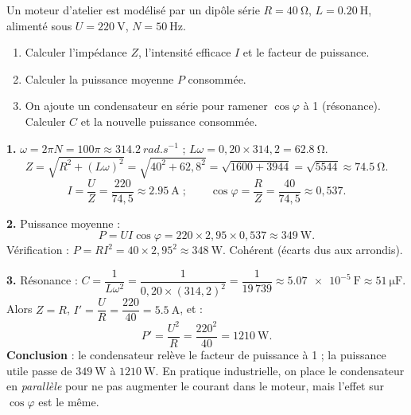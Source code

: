 \documentclass[11pt]{article}
\begin{document}
\begin{exoresolu}
Un moteur d'atelier est modélisé par un dipôle série $R = \SI{40}{\ohm}$, $L = \SI{0,20}{\henry}$, alimenté sous $U = \SI{220}{\volt}$, $N = \SI{50}{\hertz}$.
\begin{enumerate}
\item Calculer l'impédance $Z$, l'intensité efficace $I$ et le facteur de puissance.
\item Calculer la puissance moyenne $P$ consommée.
\item On ajoute un condensateur en série pour ramener $\cos\varphi$ à 1 (résonance). Calculer $C$ et la nouvelle puissance consommée.
\end{enumerate}
\tcblower
\textbf{1.} $\omega = 2\pi N = 100\pi \approx \SI{314,2}{rad.s^{-1}}$ ; $L\omega = 0{,}20 \times 314{,}2 = \SI{62,8}{\ohm}$.
\[ Z = \sqrt{R^{2} + (L\omega)^{2}} = \sqrt{40^{2} + 62{,}8^{2}} = \sqrt{1600 + 3944} = \sqrt{5544} \approx \SI{74,5}{\ohm}. \]
\[ I = \dfrac{U}{Z} = \dfrac{220}{74{,}5} \approx \SI{2,95}{\ampere} \; ; \qquad \cos\varphi = \dfrac{R}{Z} = \dfrac{40}{74{,}5} \approx 0{,}537. \]

\textbf{2.} Puissance moyenne :
\[ P = UI\cos\varphi = 220 \times 2{,}95 \times 0{,}537 \approx \SI{349}{\watt}. \]
Vérification : $P = RI^{2} = 40 \times 2{,}95^{2} \approx \SI{348}{\watt}$. Cohérent (écarts dus aux arrondis).

\textbf{3.} Résonance : $C = \dfrac{1}{L\omega^{2}} = \dfrac{1}{0{,}20 \times (314{,}2)^{2}} = \dfrac{1}{19\,739} \approx \SI{5,07e-5}{\farad} \approx \SI{51}{\micro\farad}$.
Alors $Z = R$, $I' = \dfrac{U}{R} = \dfrac{220}{40} = \SI{5,5}{\ampere}$, et :
\[ P' = \dfrac{U^{2}}{R} = \dfrac{220^{2}}{40} = \SI{1210}{\watt}. \]
\textbf{Conclusion} : le condensateur relève le facteur de puissance à 1 ; la puissance utile passe de $\SI{349}{\watt}$ à $\SI{1210}{\watt}$. En pratique industrielle, on place le condensateur en \emph{parallèle} pour ne pas augmenter le courant dans le moteur, mais l'effet sur $\cos\varphi$ est le même.
\end{exoresolu}
\end{document}
